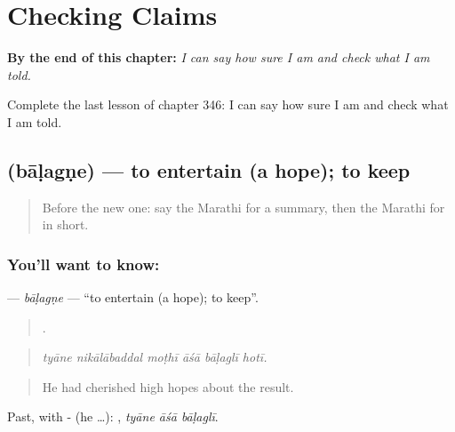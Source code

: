 
\chapter{Checking Claims}
\label{ch:mr-checking-claims}

\begin{chapteropening}
\textbf{By the end of this chapter:} \emph{I can say how sure I am and check what I am told.}

Complete the last lesson of chapter 346: I can say how sure I am and check what I am told.
\end{chapteropening}

\section[\texorpdfstring{\mr{बाळगणे} (bāḷagṇe)}{बाळगणे (bāḷagṇe)}]{ (bāḷagṇe) — to entertain (a hope); to keep}

\label{lesson:MR-C346-balagne}



\begin{quote}
Before the new one: say the Marathi for a summary, then the Marathi for in short.
\end{quote}

\subsection*{You'll want to know: }
\textbf{} — \emph{bāḷagṇe} — \textquotedblleft{}to entertain (a hope); to keep\textquotedblright{}.

\begin{quote}
     .
\end{quote}

\begin{quote}
\emph{tyāne nikālābaddal moṭhī āśā bāḷaglī hotī.}
\end{quote}

\begin{quote}
He had cherished high hopes about the result.
\end{quote}

Past, with - (he …):   , \emph{tyāne āśā bāḷaglī}.

